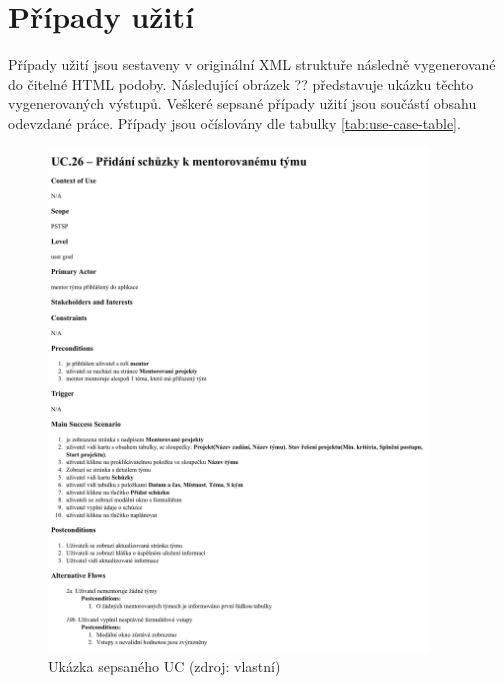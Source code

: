 \documentclass[czech,BP]{thesiskiv}
\begin{document}
{\raggedright\small


\appendix
\chapter{Případy užití}
Případy užití jsou sestaveny v originální XML struktuře následně vygenerované do čitelné HTML podoby. Následující obrázek ?? představuje ukázku těchto vygenerovaných výstupů. Veškeré sepsané případy užití jsou součástí obsahu odevzdané práce. Případy jsou očíslovány dle tabulky \ref{tab:use-case-table}.

\begin{figure}[H]
	\centering
	\includegraphics[width=0.9\textwidth]{img/use_case/use_case_example}
	\caption{Ukázka sepsaného UC (zdroj: vlastní)}
	\label{fig:uc_example}
\end{figure}

}
\end{document}

